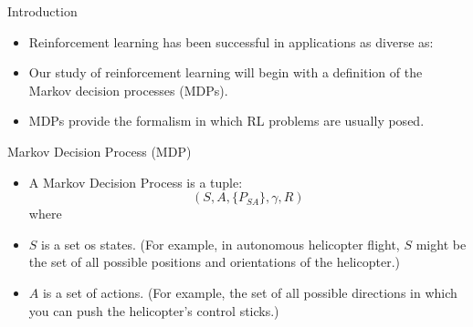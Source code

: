 \documentclass[handout]{beamer}
\begin{document}
\begin{frame}{Introduction}
\scriptsize{
\begin{itemize}
\item Reinforcement learning has been successful in applications as diverse as:


\item Our study of reinforcement learning will begin with a definition of
the Markov decision processes (MDPs).
\item MDPs provide the formalism in which RL problems are usually posed.
\end{itemize}


} 

\end{frame}


\begin{frame}{Markov Decision Process (MDP)}
\scriptsize{
\begin{itemize}
\item A Markov Decision Process is a tuple: 
\begin{displaymath}
 (S,A,\{P_{SA}\},\gamma,R)
\end{displaymath}
where
\item $S$ is a set os states. (For example, in autonomous helicopter flight, $S$
might be the set of all possible positions and orientations of the helicopter.)
\item $A$ is a set of actions. (For example, the set of all possible directions in
which you can push the helicopter's control sticks.)

\end{itemize}


} 

\end{frame}
\end{document}
